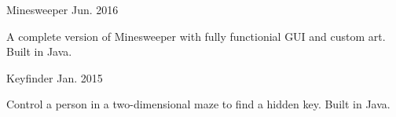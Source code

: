     \vspace{-10pt}
\begin{cventries}
  \cventry
    {}
    {Minesweeper}
    {Jun. 2016}
    {}
    {
    \vspace{-12pt}
      \begin{cvitems}
        \item {A complete version of Minesweeper with fully functionial GUI and custom art. Built in Java.}
      \end{cvitems}
    }
    
\vspace{-20pt}
    
  \cventry
    {}
    {Keyfinder}
    {Jan. 2015}
    {}
    {
    \vspace{-12pt}
      \begin{cvitems}
        \item {Control a person in a two-dimensional maze to find a hidden key. Built in Java.}
      \end{cvitems}
    }

\end{cventries}

